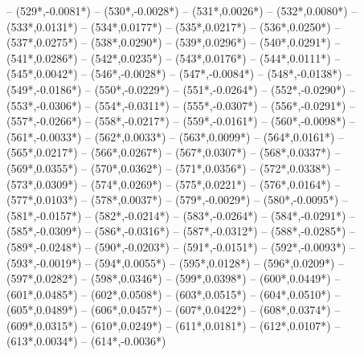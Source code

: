 {		-- ({529*\dx},{-0.0081*\dy})
		-- ({530*\dx},{-0.0028*\dy})
		-- ({531*\dx},{0.0026*\dy})
		-- ({532*\dx},{0.0080*\dy})
		-- ({533*\dx},{0.0131*\dy})
		-- ({534*\dx},{0.0177*\dy})
		-- ({535*\dx},{0.0217*\dy})
		-- ({536*\dx},{0.0250*\dy})
		-- ({537*\dx},{0.0275*\dy})
		-- ({538*\dx},{0.0290*\dy})
		-- ({539*\dx},{0.0296*\dy})
		-- ({540*\dx},{0.0291*\dy})
		-- ({541*\dx},{0.0286*\dy})
		-- ({542*\dx},{0.0235*\dy})
		-- ({543*\dx},{0.0176*\dy})
		-- ({544*\dx},{0.0111*\dy})
		-- ({545*\dx},{0.0042*\dy})
		-- ({546*\dx},{-0.0028*\dy})
		-- ({547*\dx},{-0.0084*\dy})
		-- ({548*\dx},{-0.0138*\dy})
		-- ({549*\dx},{-0.0186*\dy})
		-- ({550*\dx},{-0.0229*\dy})
		-- ({551*\dx},{-0.0264*\dy})
		-- ({552*\dx},{-0.0290*\dy})
		-- ({553*\dx},{-0.0306*\dy})
		-- ({554*\dx},{-0.0311*\dy})
		-- ({555*\dx},{-0.0307*\dy})
		-- ({556*\dx},{-0.0291*\dy})
		-- ({557*\dx},{-0.0266*\dy})
		-- ({558*\dx},{-0.0217*\dy})
		-- ({559*\dx},{-0.0161*\dy})
		-- ({560*\dx},{-0.0098*\dy})
		-- ({561*\dx},{-0.0033*\dy})
		-- ({562*\dx},{0.0033*\dy})
		-- ({563*\dx},{0.0099*\dy})
		-- ({564*\dx},{0.0161*\dy})
		-- ({565*\dx},{0.0217*\dy})
		-- ({566*\dx},{0.0267*\dy})
		-- ({567*\dx},{0.0307*\dy})
		-- ({568*\dx},{0.0337*\dy})
		-- ({569*\dx},{0.0355*\dy})
		-- ({570*\dx},{0.0362*\dy})
		-- ({571*\dx},{0.0356*\dy})
		-- ({572*\dx},{0.0338*\dy})
		-- ({573*\dx},{0.0309*\dy})
		-- ({574*\dx},{0.0269*\dy})
		-- ({575*\dx},{0.0221*\dy})
		-- ({576*\dx},{0.0164*\dy})
		-- ({577*\dx},{0.0103*\dy})
		-- ({578*\dx},{0.0037*\dy})
		-- ({579*\dx},{-0.0029*\dy})
		-- ({580*\dx},{-0.0095*\dy})
		-- ({581*\dx},{-0.0157*\dy})
		-- ({582*\dx},{-0.0214*\dy})
		-- ({583*\dx},{-0.0264*\dy})
		-- ({584*\dx},{-0.0291*\dy})
		-- ({585*\dx},{-0.0309*\dy})
		-- ({586*\dx},{-0.0316*\dy})
		-- ({587*\dx},{-0.0312*\dy})
		-- ({588*\dx},{-0.0285*\dy})
		-- ({589*\dx},{-0.0248*\dy})
		-- ({590*\dx},{-0.0203*\dy})
		-- ({591*\dx},{-0.0151*\dy})
		-- ({592*\dx},{-0.0093*\dy})
		-- ({593*\dx},{-0.0019*\dy})
		-- ({594*\dx},{0.0055*\dy})
		-- ({595*\dx},{0.0128*\dy})
		-- ({596*\dx},{0.0209*\dy})
		-- ({597*\dx},{0.0282*\dy})
		-- ({598*\dx},{0.0346*\dy})
		-- ({599*\dx},{0.0398*\dy})
		-- ({600*\dx},{0.0449*\dy})
		-- ({601*\dx},{0.0485*\dy})
		-- ({602*\dx},{0.0508*\dy})
		-- ({603*\dx},{0.0515*\dy})
		-- ({604*\dx},{0.0510*\dy})
		-- ({605*\dx},{0.0489*\dy})
		-- ({606*\dx},{0.0457*\dy})
		-- ({607*\dx},{0.0422*\dy})
		-- ({608*\dx},{0.0374*\dy})
		-- ({609*\dx},{0.0315*\dy})
		-- ({610*\dx},{0.0249*\dy})
		-- ({611*\dx},{0.0181*\dy})
		-- ({612*\dx},{0.0107*\dy})
		-- ({613*\dx},{0.0034*\dy})
		-- ({614*\dx},{-0.0036*\dy})
}

